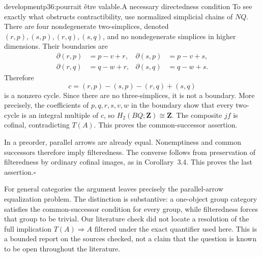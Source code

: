 \begin{dcomment}{development}{p36:pourrait être valable.}{A necessary directedness condition}
To see exactly what obstructs contractibility, use normalized simplicial chains of $NQ$. There are four nondegenerate two-simplices, denoted $(r,p),(s,p),(r,q),(s,q)$, and no nondegenerate simplices in higher dimensions. Their boundaries are
\[
\begin{aligned}
 \partial(r,p)&=p-v+r,&\partial(s,p)&=p-v+s,\\
 \partial(r,q)&=q-w+r,&\partial(s,q)&=q-w+s.
\end{aligned}
\]
Therefore
\[
 c=(r,p)-(s,p)-(r,q)+(s,q)
\]
is a nonzero cycle. Since there are no three-simplices, it is not a boundary. More precisely, the coefficients of $p,q,r,s,v,w$ in the boundary show that every two-cycle is an integral multiple of $c$, so $H_2(BQ;\mathbf Z)\cong\mathbf Z$. The composite $jf$ is cofinal, contradicting $T(A)$. This proves the common-successor assertion.

In a preorder, parallel arrows are already equal. Nonemptiness and common successors therefore imply filteredness. The converse follows from preservation of filteredness by ordinary cofinal images, as in Corollary~3.4. This proves the last assertion.\hfill$\square$

For general categories the argument leaves precisely the parallel-arrow equalization problem. The distinction is substantive: a one-object group category satisfies the common-successor condition for every group, while filteredness forces that group to be trivial. Our literature check did not locate a resolution of the full implication $T(A)\Rightarrow A\text{ filtered}$ under the exact quantifier used here. This is a bounded report on the sources checked, not a claim that the question is known to be open throughout the literature.
\end{dcomment}

